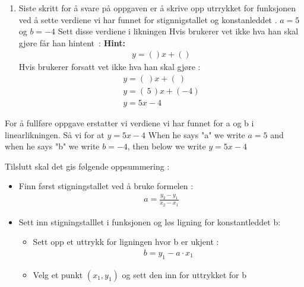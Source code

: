 \documentclass[12pt,twoside,onecolumn]{article}
\begin{document}
\begin{Exercise}
\begin{enumerate}
\item Siste skritt for å svare på oppgaven er å skrive opp utrrykket for funksjonen ved å sette verdiene vi har funnet for stignnigstallet og konstanleddet .
\newline
$a=5$ og $b=-4$
\newline
Sett disse verdiene i likningen
{\color{Maroon}
Hvis brukerer vet ikke hva han skal gjøre får han \mbox{hintent :}} \newline
\textbf{Hint:}
\begin{align}
y = ()x + ()
\end{align}
{\color{Maroon}
Hvis brukerer forsatt vet ikke hva han skal gjøre :}
\begin{align}
y = (\:)x + (\:)\\
y = (\, 5 \, )x  + (-4 )  \\
y = 5x - 4
\end{align}
\end{enumerate}

{\color{gray}For å fullføre oppgave erstatter vi verdiene vi har funnet for a og b i linearlikningen. Så vi for at $y=5x-4$}
\newline
{\color{PineGreen} When he says "a" we write $a=5$ and when he says "b" we write $b=-4$, then below we write $y=5x-4$} 
\newline


{\color{Maroon}Tilslutt skal det gis følgende oppsummering :}
\begin{itemize}
\item Finn først stigningstallet ved å bruke formelen :
\begin{align}
a =  \frac{y_2 - y_1}{x_2 - x_1}
\end{align}
\item Sett inn stigningstalllet i funksjonen og løs ligning for konstantleddet b:
\begin{itemize}
\item Sett opp et uttrykk for ligningen hvor b er ukjent :
\begin{align}
b = y_1 - a\cdot x_1
\end{align}
\item Velg et punkt $(x_1, y_1)$ og sett den inn for uttrykket for b
\end{itemize}
\end{itemize}
\end{Exercise}
\end{document}
